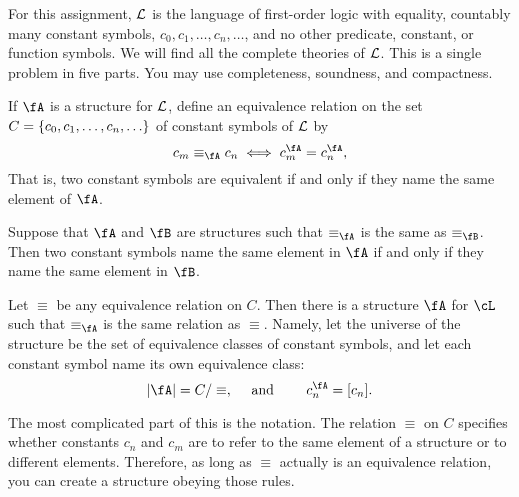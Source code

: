 \documentclass[9pt,reqno]{amsart}
\begin{document}
\setlength{\headheight}{14.0pt}
\setlength{\footskip}{14.0pt}


\bigskip
For this assignment, $\mathcal{L}$ is the language of first-order logic with equality,
countably many constant symbols, $c_0, c_1, \ldots, c_n, \ldots$, and no other
predicate, constant, or function symbols.
We will find all the complete theories of $\mathcal{L}$.
This is a single problem in five parts.
You may use completeness, soundness, and compactness.

If $\fA$ is a structure for $\mathcal{L}$, define an equivalence relation on the set
$C = \left\{c_0, c_1, \ldots, c_n, \ldots \right\}$ of constant symbols of $\mathcal{L}$
by \[ c_m \equiv_\fA c_n \Iff c_m^\fA = c_n^\fA, \]
That is, two constant symbols are equivalent if and only if they name the
same element of $\fA$.

Suppose that $\fA$ and $\fB$ are structures such that $\equiv_\fA$
is the same as $\equiv_\fB$.
Then two constant symbols name the same element in $\fA$ if and only if
they name the same element in $\fB$.

Let $\equiv$ be any equivalence relation on $C$.
Then there is a structure $\fA$ for $\cL$ such that $\equiv_\fA$
is the same relation as $\equiv$. Namely, let the universe of the structure
be the set of equivalence classes of constant symbols, and let each
constant symbol name its own equivalence class:
\[ \abs{\fA} = C / \equiv, \quad \text{ and } \quad \quad c_n^\fA = [c_n]. \]

The most complicated part of this is the notation.
The relation $\equiv$ on $C$ specifies whether constants $c_n$ and $c_m$
are to refer to the same element of a structure or to different elements.
Therefore, as long as $\equiv$ actually is an equivalence relation,
you can create a structure obeying those rules.

\newpage


\newpage


\newpage


\newpage


\newpage


\vfill
\end{document}
